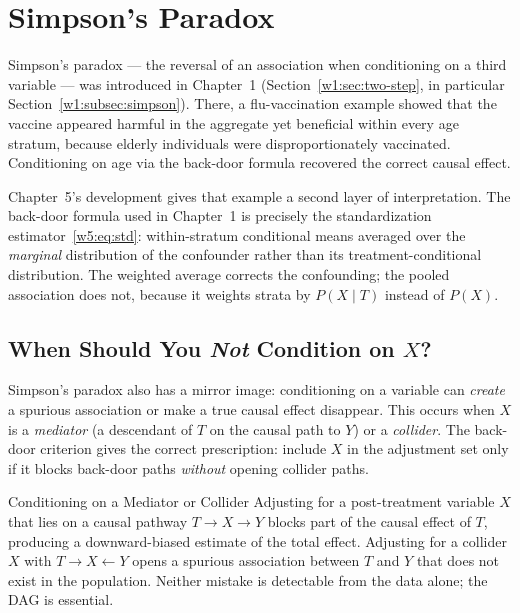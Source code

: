 \documentclass[master.tex]{subfiles}
\begin{document}
\section{Simpson's Paradox}
\label{w5:sec:simpson}

Simpson's paradox --- the reversal of an association when conditioning
on a third variable --- was introduced in Chapter~1
(Section~\ref{w1:sec:two-step}, in particular
Section~\ref{w1:subsec:simpson}).  There, a flu-vaccination example
showed that the vaccine appeared harmful in the aggregate yet beneficial
within every age stratum, because elderly individuals were
disproportionately vaccinated.  Conditioning on age via the back-door
formula recovered the correct causal effect.

Chapter~5's development gives that example a second layer of
interpretation.  The back-door formula used in Chapter~1 is precisely
the standardization estimator~\eqref{w5:eq:std}: within-stratum
conditional means averaged over the \emph{marginal} distribution of the
confounder rather than its treatment-conditional distribution.  The
weighted average corrects the confounding; the pooled association does
not, because it weights strata by $P(X \mid T)$ instead of $P(X)$.

\subsection{When Should You \emph{Not} Condition on $X$?}
\label{w5:subsec:simpson-collider}

Simpson's paradox also has a mirror image: conditioning on a variable
can \emph{create} a spurious association or make a true causal effect
disappear.  This occurs when $X$ is a \emph{mediator} (a descendant of
$T$ on the causal path to $Y$) or a \emph{collider}.  The back-door
criterion gives the correct prescription: include $X$ in the adjustment
set only if it blocks back-door paths \emph{without} opening collider
paths.

\begin{warn}{Conditioning on a Mediator or Collider}
Adjusting for a post-treatment variable $X$ that lies on a causal
pathway $T \to X \to Y$ blocks part of the causal effect of $T$,
producing a downward-biased estimate of the total effect.  Adjusting
for a collider $X$ with $T \to X \leftarrow Y$ opens a spurious
association between $T$ and $Y$ that does not exist in the
population.  Neither mistake is detectable from the data alone; the
DAG is essential.
\end{warn}
\end{document}
